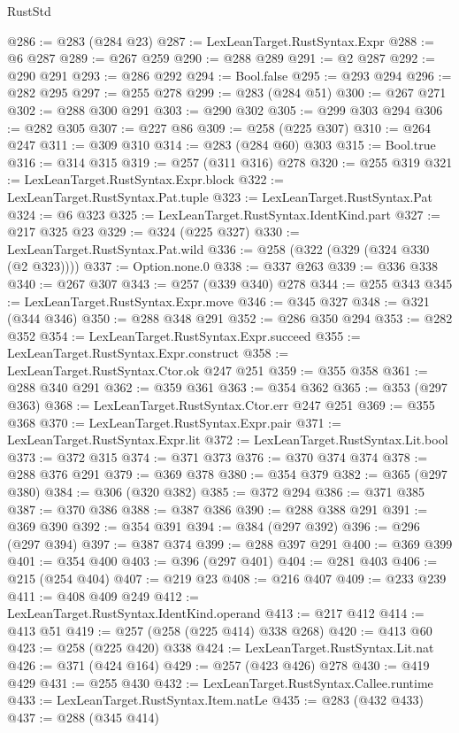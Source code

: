 \begin{lexlean}{RustStd}
\begin{coremodule}
@286 := @283 (@284 @23)
@287 := LexLeanTarget.RustSyntax.Expr
@288 := @6 @287
@289 := @267 @259
@290 := @288 @289
@291 := @2 @287
@292 := @290 @291
@293 := @286 @292
@294 := Bool.false
@295 := @293 @294
@296 := @282 @295
@297 := @255 @278
@299 := @283 (@284 @51)
@300 := @267 @271
@302 := @288 @300 @291
@303 := @290 @302
@305 := @299 @303 @294
@306 := @282 @305
@307 := @227 @86
@309 := @258 (@225 @307)
@310 := @264 @247
@311 := @309 @310
@314 := @283 (@284 @60) @303
@315 := Bool.true
@316 := @314 @315
@319 := @257 (@311 @316) @278
@320 := @255 @319
@321 := LexLeanTarget.RustSyntax.Expr.block
@322 := LexLeanTarget.RustSyntax.Pat.tuple
@323 := LexLeanTarget.RustSyntax.Pat
@324 := @6 @323
@325 := LexLeanTarget.RustSyntax.IdentKind.part
@327 := @217 @325 @23
@329 := @324 (@225 @327)
@330 := LexLeanTarget.RustSyntax.Pat.wild
@336 := @258 (@322 (@329 (@324 @330 (@2 @323))))
@337 := Option.none.{0}
@338 := @337 @263
@339 := @336 @338
@340 := @267 @307
@343 := @257 (@339 @340) @278
@344 := @255 @343
@345 := LexLeanTarget.RustSyntax.Expr.move
@346 := @345 @327
@348 := @321 (@344 @346)
@350 := @288 @348 @291
@352 := @286 @350 @294
@353 := @282 @352
@354 := LexLeanTarget.RustSyntax.Expr.succeed
@355 := LexLeanTarget.RustSyntax.Expr.construct
@358 := LexLeanTarget.RustSyntax.Ctor.ok @247 @251
@359 := @355 @358
@361 := @288 @340 @291
@362 := @359 @361
@363 := @354 @362
@365 := @353 (@297 @363)
@368 := LexLeanTarget.RustSyntax.Ctor.err @247 @251
@369 := @355 @368
@370 := LexLeanTarget.RustSyntax.Expr.pair
@371 := LexLeanTarget.RustSyntax.Expr.lit
@372 := LexLeanTarget.RustSyntax.Lit.bool
@373 := @372 @315
@374 := @371 @373
@376 := @370 @374 @374
@378 := @288 @376 @291
@379 := @369 @378
@380 := @354 @379
@382 := @365 (@297 @380)
@384 := @306 (@320 @382)
@385 := @372 @294
@386 := @371 @385
@387 := @370 @386
@388 := @387 @386
@390 := @288 @388 @291
@391 := @369 @390
@392 := @354 @391
@394 := @384 (@297 @392)
@396 := @296 (@297 @394)
@397 := @387 @374
@399 := @288 @397 @291
@400 := @369 @399
@401 := @354 @400
@403 := @396 (@297 @401)
@404 := @281 @403
@406 := @215 (@254 @404)
@407 := @219 @23
@408 := @216 @407
@409 := @233 @239
@411 := @408 @409 @249
@412 := LexLeanTarget.RustSyntax.IdentKind.operand
@413 := @217 @412
@414 := @413 @51
@419 := @257 (@258 (@225 @414) @338 @268)
@420 := @413 @60
@423 := @258 (@225 @420) @338
@424 := LexLeanTarget.RustSyntax.Lit.nat
@426 := @371 (@424 @164)
@429 := @257 (@423 @426) @278
@430 := @419 @429
@431 := @255 @430
@432 := LexLeanTarget.RustSyntax.Callee.runtime
@433 := LexLeanTarget.RustSyntax.Item.natLe
@435 := @283 (@432 @433)
@437 := @288 (@345 @414)

\end{coremodule}
\end{lexlean}
